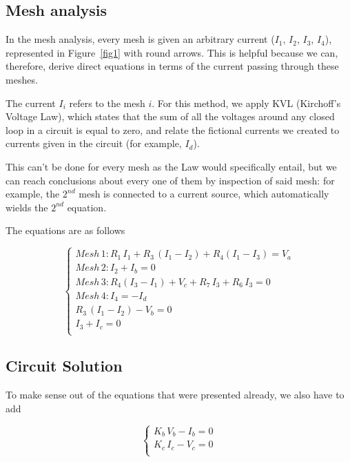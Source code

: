 \subsection{Mesh analysis}


In the mesh analysis, every mesh is given an arbitrary current ($I_1$, $I_2$, $I_3$, $I_4$), represented in Figure~\ref{fig1} with round arrows. This is helpful because we can, therefore, derive direct equations in terms of the current passing through these meshes.

The current $I_i$ refers to the mesh $i$. For this method, we apply KVL (Kirchoff's Voltage Law), which states that the sum of all the voltages around any closed loop in a circuit is equal to zero, and relate the fictional currents we created to currents given in the circuit (for example, $I_d$).

This can't be done for every mesh as the Law would specifically entail, but we can reach conclusions about every one of them by inspection of said mesh: for example, the $2^{nd}$ mesh is connected to a current source, which automatically wields the $2^{nd}$ equation.

The equations are as follows

\begin{equation} 
\begin{cases}  
    Mesh\, 1: R_1\,I_1 + R_3\,(I_1 - I_2) + R_4(I_1 - I_3) = V_a \\
    Mesh\, 2: I_2 + I_b = 0\\
    Mesh\, 3: R_4(I_3 - I_1) + V_c + R_7\,I_3 + R_6\,I_3 = 0 \\
    Mesh\, 4: I_4 = -I_d \\
    R_3\, (I_1 - I_2) - V_b = 0\\
    I_3 + I_c = 0 \\

\end{cases}
\label{eq:2}
\end{equation}

\subsection{Circuit Solution}

To make sense out of the equations that were presented already, we also have to add

\begin{equation} 
\begin{cases}  
   K_b\,V_b - I_b = 0 \\
  K_c\, I_c - V_c = 0 \\
\end{cases}
\label{eq:3}
\end{equation}

